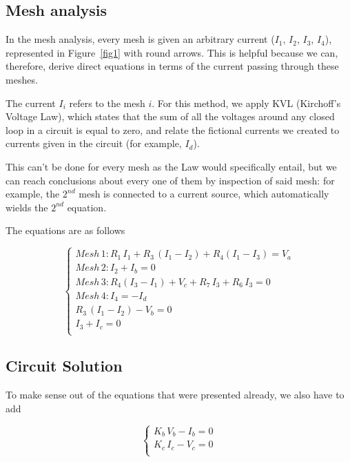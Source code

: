 \subsection{Mesh analysis}


In the mesh analysis, every mesh is given an arbitrary current ($I_1$, $I_2$, $I_3$, $I_4$), represented in Figure~\ref{fig1} with round arrows. This is helpful because we can, therefore, derive direct equations in terms of the current passing through these meshes.

The current $I_i$ refers to the mesh $i$. For this method, we apply KVL (Kirchoff's Voltage Law), which states that the sum of all the voltages around any closed loop in a circuit is equal to zero, and relate the fictional currents we created to currents given in the circuit (for example, $I_d$).

This can't be done for every mesh as the Law would specifically entail, but we can reach conclusions about every one of them by inspection of said mesh: for example, the $2^{nd}$ mesh is connected to a current source, which automatically wields the $2^{nd}$ equation.

The equations are as follows

\begin{equation} 
\begin{cases}  
    Mesh\, 1: R_1\,I_1 + R_3\,(I_1 - I_2) + R_4(I_1 - I_3) = V_a \\
    Mesh\, 2: I_2 + I_b = 0\\
    Mesh\, 3: R_4(I_3 - I_1) + V_c + R_7\,I_3 + R_6\,I_3 = 0 \\
    Mesh\, 4: I_4 = -I_d \\
    R_3\, (I_1 - I_2) - V_b = 0\\
    I_3 + I_c = 0 \\

\end{cases}
\label{eq:2}
\end{equation}

\subsection{Circuit Solution}

To make sense out of the equations that were presented already, we also have to add

\begin{equation} 
\begin{cases}  
   K_b\,V_b - I_b = 0 \\
  K_c\, I_c - V_c = 0 \\
\end{cases}
\label{eq:3}
\end{equation}

